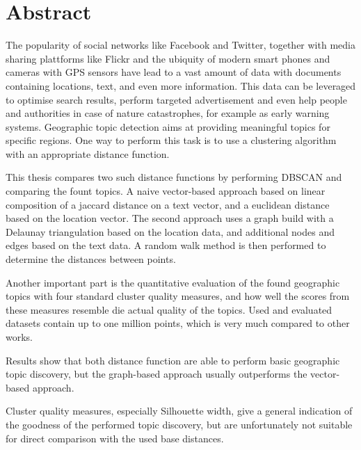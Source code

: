 \chapter*{Abstract}
The popularity of social networks like Facebook and Twitter, together with media sharing plattforms like Flickr and the ubiquity of modern smart phones and cameras with GPS sensors have lead to a vast amount of data with documents containing locations, text, and even more information. This data can be leveraged to optimise search results, perform targeted advertisement and even help people and authorities in case of nature catastrophes, for example as early warning systems. Geographic topic detection aims at providing meaningful topics for specific regions. One way to perform this task is to use a clustering algorithm with an appropriate distance function.

This thesis compares two such distance functions by performing DBSCAN  and comparing the fount topics. A naive vector-based approach based on linear composition of a jaccard distance on a text vector, and a euclidean distance based on the location vector. The second approach uses a graph build with a Delaunay triangulation based on the location data, and additional nodes and edges based on the text data. A random walk method is then performed to determine the distances between points.

Another important part is the quantitative evaluation of the found geographic topics with four standard cluster quality measures, and how well the scores from these measures resemble die actual quality of the topics. Used and evaluated datasets contain up to one million points, which is very much compared to other works.

\vspace{1em}
\noindent
Results show that both distance function are able to perform basic geographic topic discovery, but the graph-based approach usually outperforms the vector-based approach.

Cluster quality measures, especially Silhouette width, give a general indication of the goodness of the performed topic discovery, but are unfortunately not suitable for direct comparison with the used base distances.